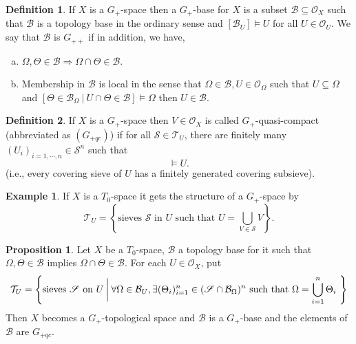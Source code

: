 \documentclass[10pt]{article}
\numberwithin{equation}{section}
\theoremstyle{definition}
\newtheorem{proposition}{Proposition}[subsection]
\newtheorem{definition}{Definition}[subsection]
\newtheorem{example}{Example}[subsection]
\newcommand{\Ouv}{\mathscr{O}}
\newcommand{\sep}[0]{\:|\:}
\newcommand{\sS}[0]{\mathscr{S}}
\newcommand{\cB}[0]{\mathcal{B}}
\begin{document}
\begin{definition}
    \label{definition_9_5}
    If $X$ is a $G_+$-space then a $G_+$-base for $X$ is a subset $\cB\subseteq\Ouv_X$ such that $\cB$ is a topology base in the ordinary sense and $[\cB_U]\vDash U$ for all $U\in\Ouv_U$. We say that $\cB$ is $G_{++}$ if in addition, we have,
    \begin{enumerate}[a.]
        \item $\Omega,\Theta\in\cB \Rightarrow \Omega\cap \Theta \in\cB$.
        \item Membership in $\cB$ is local in the sense that $\Omega\in\cB,U\in\Ouv_\Omega$ such that $U\subseteq \Omega$ and $[\Theta\in\cB_\Omega\sep U\cap \Theta\in\cB]\vDash \Omega$ then $U\in\cB$.
    \end{enumerate}
\end{definition}
\begin{definition}
    \label{definition_9_6}
    If $X$ is a $G_+$-space then $V\in\Ouv_X$ is called $G_+$-quasi-compact (abbreviated as $(G_{+qc})$) if for all $\sS\in\mathcal{T}_U$, there are finitely many $(U_i)_{i=1,\cdots,n}\in\sS^n$ such that
    \begin{equation*}
        [U_1,\cdots,U_n]\vDash U.
    \end{equation*}
    (i.e., every covering sieve of $U$ has a finitely generated covering subsieve).
\end{definition}
\begin{example}
    If $X$ is a $T_0$-space it gets the structure of a $G_+$-space by
    \begin{equation*}
    \mathcal{T}_U=\left\{\text{sieves $\sS$ in $U$ such that $U = \bigcup_{V\in \sS}V$}\right\}.
    \end{equation*}
\end{example}
\begin{proposition}
    \label{proposition_9_2}
    Let $X$ be a $T_0$-space, $\cB$ a topology base for it such that $\Omega,\Theta\in\cB$ implies $\Omega\cap\Theta\in\cB$. For each $U\in\Ouv_X$, put
    \begin{equation*}
        \mathcal{T}_U = \left\{\text{sieves $\sS$ on $U$}\:\bigg{|}\:\forall \Omega\in\cB_U,\exists (\Theta_i)_{i=1}^n\in(\sS\cap\cB_\Omega)^n\text{ such that $\Omega=\bigcup_{i=1}^n\Theta_i$ }\right\}
    \end{equation*}
    Then $X$ becomes a $G_+$-topological space and $\cB$ is a $G_+$-base and the elements of $\cB$ are $G_{+qc}$.
\end{proposition}
\end{document}
